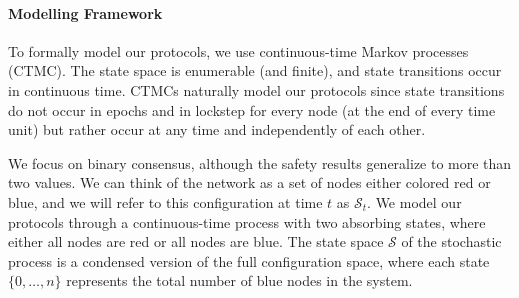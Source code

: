 \documentclass[letterpaper,twocolumn,10pt]{article}
\theoremstyle{definition}
\begin{document}
\paragraph{Modelling Framework} To formally model our protocols, we use continuous-time Markov processes (CTMC). 
The state space is enumerable (and finite), and state transitions occur in continuous time. 
CTMCs naturally model our protocols since state transitions do not occur in epochs and in lockstep for every node (at the end of every time unit) but rather occur at any time and independently of each other. 

We focus on binary consensus, although the safety results generalize to more than two values. We can think of the network as a set of nodes either colored red or blue, and we will refer to this configuration at time $t$ as $\mathcal{S}_t$. 
We model our protocols through a continuous-time process with two absorbing states, where either all nodes are red or all nodes are blue. 
The state space $\mathcal{S}$ of the stochastic process is a condensed version of the full configuration space, where each state $\{0, \dots, n\}$ represents the total number of blue nodes in the system. 
\end{document}
